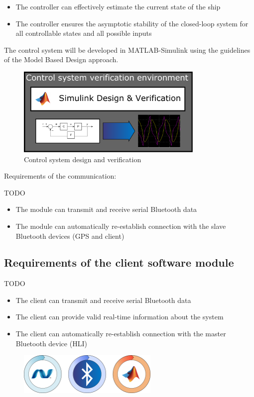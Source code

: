 \begin{itemize}

\item The controller can effectively estimate the current state of the ship
\item The controller ensures the asymptotic stability of the closed-loop system for all controllable states and all possible inputs

\end{itemize}

The control system will be developed in MATLAB-Simulink using the guidelines of the Model Based Design approach.
\begin{figure}[H]
	\centering
	\includegraphics[width=0.8\textwidth]{img2/SimVer}
	\caption{Control system design and verification}
	\label{simver}
\end{figure}

Requirements of the communication:

TODO

\begin{itemize}

\item The module can transmit and receive serial Bluetooth data
\item The module can automatically re-establish connection with the slave Bluetooth devices (GPS and client)

\end{itemize}

\subsection{Requirements of the client software module}

TODO

\begin{itemize}

\item The client can transmit and receive serial Bluetooth data
\item The client can provide valid real-time information about the system
\item The client can automatically re-establish connection with the master Bluetooth device (HLI)

\end{itemize}

\begin{figure}[H]
	\centering
	\includegraphics[width=0.6\textwidth]{img2/VeriBadges}
	\caption{}
	\label{}
\end{figure}